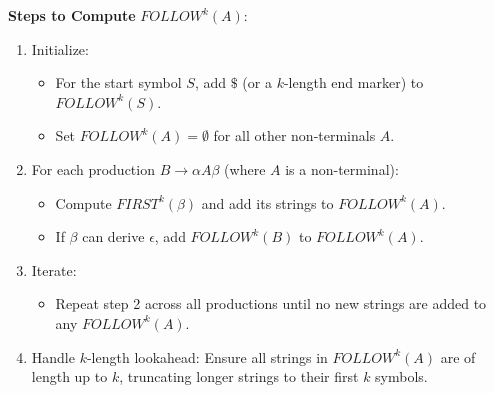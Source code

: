 \textbf{Steps to Compute} $FOLLOW^k(A)$:
\begin{enumerate}
\item Initialize:
   \begin{itemize}
   \item For the start symbol $S$, add $\$$ (or a $k$-length end marker) to $FOLLOW^k(S)$.
   \item Set $FOLLOW^k(A) = \emptyset$ for all other non-terminals $A$.
   \end{itemize}
\item For each production $B \to \alpha A \beta$ (where $A$ is a non-terminal):
   \begin{itemize}
   \item Compute $FIRST^k(\beta)$ and add its strings to $FOLLOW^k(A)$.
   \item If $\beta$ can derive $\epsilon$, add $FOLLOW^k(B)$ to $FOLLOW^k(A)$.
   \end{itemize}
\item Iterate:
   \begin{itemize}
   \item Repeat step 2 across all productions until no new strings are added to any $FOLLOW^k(A)$.
   \end{itemize}
\item Handle $k$-length lookahead: Ensure all strings in $FOLLOW^k(A)$ are of length up to $k$, truncating longer strings to their first $k$ symbols.
\end{enumerate}
